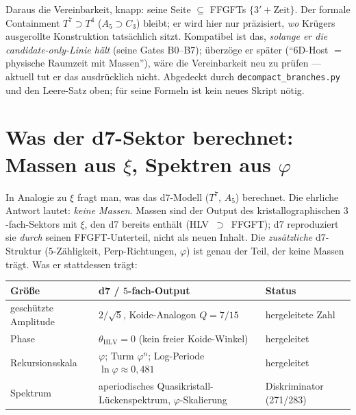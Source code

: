 Daraus die Vereinbarkeit, knapp: seine Seite $\subseteq$ FFGFTs $\{3'+\text{Zeit}\}$. Der formale
Containment $T^7\supset T^4$ ($A_5\supset C_3$) bleibt; er wird hier nur pr\"azisiert, \emph{wo}
Kr\"ugers ausgerollte Konstruktion tats\"achlich sitzt. Kompatibel ist das, \emph{solange er die
candidate-only-Linie h\"alt} (seine Gates B0--B7); \"uberz\"oge er sp\"ater
(\enquote{$6$D-Host $=$ physische Raumzeit mit Massen}), w\"are die Vereinbarkeit neu zu pr\"ufen ---
aktuell tut er das ausdr\"ucklich nicht. Abgedeckt durch \texttt{decompact\_branches.py} und den
Leere-Satz oben; f\"ur seine Formeln ist kein neues Skript n\"otig.

\section{Was der d7-Sektor berechnet: Massen aus $\xi$, Spektren aus $\varphi$}
In Analogie zu $\xi$ fragt man, was das d7-Modell ($T^7$, $A_5$) berechnet. Die ehrliche
Antwort lautet: \emph{keine Massen}. Massen sind der Output des kristallographischen
$3$-fach-Sektors mit $\xi$, den d7 bereits enth\"alt (HLV~$\supset$~FFGFT); d7 reproduziert sie
\emph{durch} seinen FFGFT-Unterteil, nicht als neuen Inhalt. Die \emph{zus\"atzliche}
d7-Struktur ($5$-Z\"ahligkeit, Perp-Richtungen, $\varphi$) ist genau der Teil, der keine Massen
tr\"agt. Was er stattdessen tr\"agt:

\begin{center}\small\renewcommand{\arraystretch}{1.2}
\begin{tabular}{@{}p{3.4cm} p{5.6cm} p{2.8cm}@{}}
\toprule
Gr\"o\ss e & d7 / $5$-fach-Output & Status \\
\midrule
gesch\"utzte Amplitude & $2/\sqrt5$, Koide-Analogon $Q=7/15$ & hergeleitete Zahl \\
Phase & $\theta_{\mathrm{HLV}}=0$ (kein freier Koide-Winkel) & hergeleitet \\
Rekursionsskala & $\varphi$; Turm $\varphi^n$; Log-Periode $\ln\varphi\approx0{,}481$ & hergeleitet \\
Spektrum & aperiodisches Quasikristall-L\"uckenspektrum, $\varphi$-Skalierung & Diskriminator (271/283) \\
\bottomrule
\end{tabular}
\end{center}

